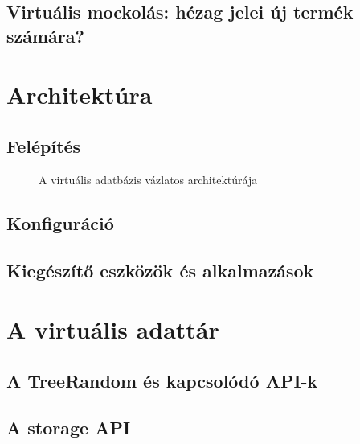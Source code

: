 \documentclass[
    parspace, %
    noindent, %
]{elteiktdk}[2023/10/30]
\begin{document}

\section{Virtuális mockolás: hézag jelei új termék számára?}


\chapter{Architektúra}

\section{Felépítés}


\begin{figure}[H]
\centering

\caption{A virtuális adatbázis vázlatos architektúrája}
\label{A virtuális adatbázis vázlatos architektúrája}
\end{figure}

\section{Konfiguráció}


\section{Kiegészítő eszközök és alkalmazások}


\chapter{A virtuális adattár}

\section{A TreeRandom és kapcsolódó API-k}


\section{A storage API}
\end{document}
